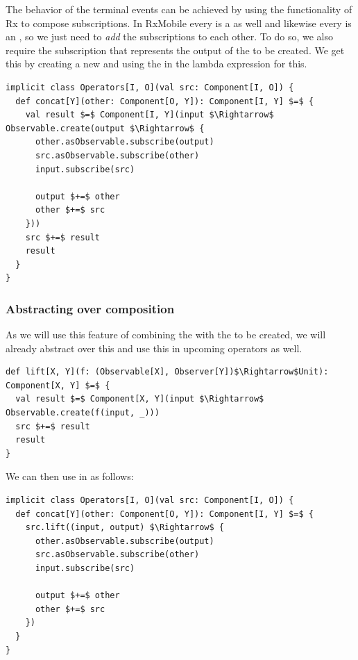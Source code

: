 The behavior of the terminal events can be achieved by using the functionality of Rx to compose subscriptions. In RxMobile every \obv is a \subs as well and likewise every \comp is an \obv, so we just need to \textit{add} the subscriptions to each other. To do so, we also require the subscription that represents the output of the \comp to be created. We get this by creating a new \obs and using the \obv in the lambda expression for this.

\begin{minipage}{\linewidth}
\begin{lstlisting}[style=ScalaStyle, caption={Linear composition operator \code{concat}}, label={lst:concat-operator}]
implicit class Operators[I, O](val src: Component[I, O]) {
  def concat[Y](other: Component[O, Y]): Component[I, Y] $=$ {
    val result $=$ Component[I, Y](input $\Rightarrow$ Observable.create(output $\Rightarrow$ {
      other.asObservable.subscribe(output)
      src.asObservable.subscribe(other)
      input.subscribe(src)

      output $+=$ other
      other $+=$ src
    }))
    src $+=$ result
    result
  }
}
\end{lstlisting}
\end{minipage}

\subsubsection{Abstracting over composition}
As we will use this feature of combining the \subs with the \comp to be created, we will already abstract over this and use this in upcoming operators as well.

\begin{minipage}{\linewidth}
\begin{lstlisting}[style=ScalaStyle, caption={\code{lift} operator}, label={lst:lift-operator}]
def lift[X, Y](f: (Observable[X], Observer[Y])$\Rightarrow$Unit): Component[X, Y] $=$ {
  val result $=$ Component[X, Y](input $\Rightarrow$ Observable.create(f(input, _)))
  src $+=$ result
  result
}
\end{lstlisting}
\end{minipage}

We can then use  in  as follows:

\begin{minipage}{\linewidth}
\begin{lstlisting}[style=ScalaStyle, caption={Revised implementation of the \code{concat} operator}, label={lst:concat-revised}]
implicit class Operators[I, O](val src: Component[I, O]) {
  def concat[Y](other: Component[O, Y]): Component[I, Y] $=$ {
    src.lift((input, output) $\Rightarrow$ {
      other.asObservable.subscribe(output)
      src.asObservable.subscribe(other)
      input.subscribe(src)

      output $+=$ other
      other $+=$ src
    })
  }
}
\end{lstlisting}
\end{minipage}


